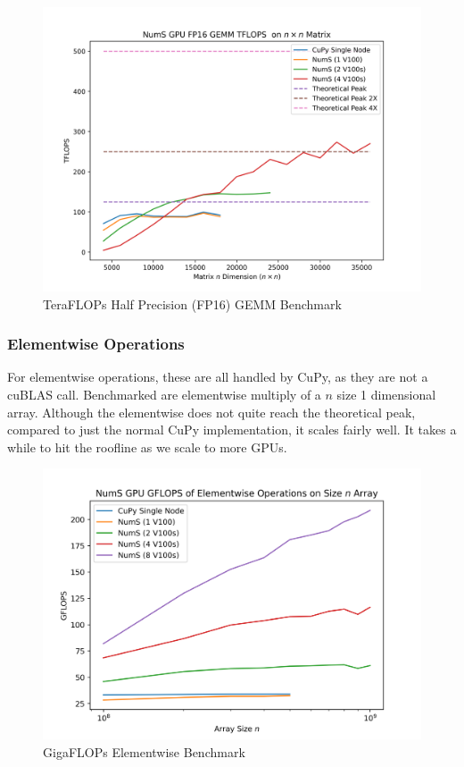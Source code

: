 \documentclass{article}
\begin{document}
\begin{figure}
  \centerline{\includegraphics[width=5in]{figures/NumS_GPU_TFLOPS_FP16GEMM.png}}
  \caption{TeraFLOPs Half Precision (FP16) GEMM Benchmark}
  \label{fig:fp16gemm}
\end{figure}

\subsubsection{Elementwise Operations}
For elementwise operations, these are all handled by CuPy, as they are not a cuBLAS call. Benchmarked are elementwise multiply of a $n$ size 1 dimensional array. Although the elementwise does not quite reach the theoretical peak, compared to just the normal CuPy implementation, it scales fairly well. It takes a while to hit the roofline as we scale to more GPUs.
 
\begin{figure}
  \centerline{\includegraphics[width=5in]{figures/NumS_GPU_FLOPS_elementwise.png}}
  \caption{GigaFLOPs Elementwise Benchmark}
  \label{fig:fp16gemm}
\end{figure}
\end{document}

